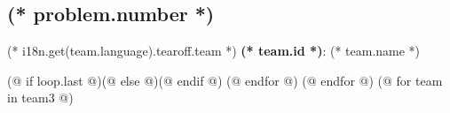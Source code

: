 \begin{minipage}[t][90mm][t]{\textwidth}
\begin{minipage}[t][88mm][t]{0.85\linewidth}
                        \subsection{\texorpdfstring{(* problem.number *)}{(* problem.number *). (* problem.id *)}}%
                        \setlength{\parskip}{6pt}
                    \end{minipage}%
                    \begin{minipage}[t][88mm][t]{0.15\linewidth}
                        \vspace{0mm}%
                        \hspace{4mm}%
                        \hspace{2pt}
                    \end{minipage}
                    {\small (* i18n.get(team.language).tearoff.team *) \textbf{(* team.id *)}: (* team.name *)}
                \end{minipage}%
                (@ if loop.last @)\newpage(@ else @)\vspace*{-1mm}(@ endif @)
            (@ endfor @)
        (@ endfor @)
        (@ for team in team3 @)%
            \setcounter{volume}{(* volume.number *)}%
            \setcounter{problem}{0}%
            \setcounter{team}{(* team.id *)}%

